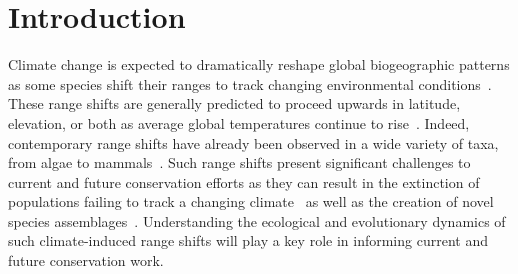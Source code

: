 \documentclass[11pt]{article}
\begin{document}
\newpage{}

\section*{Introduction}
Climate change is expected to dramatically reshape global biogeographic patterns as some species shift their ranges to track changing environmental conditions~\citep{gonzalez2010global}. These range shifts are generally predicted to proceed upwards in latitude, elevation, or both as average global temperatures continue to rise~\citep{loarie2009velocity}. Indeed, contemporary range shifts have already been observed in a wide variety of taxa, from algae to mammals~\citep{chen2011rapid, parmesan2006ecological}. Such range shifts present significant challenges to current and future conservation efforts as they can result in the extinction of populations failing to track a changing climate~\citep{parmesan2006ecological} as well as the creation of novel species assemblages~\citep{hobbs2009novel}. Understanding the ecological and evolutionary dynamics of such climate-induced range shifts will play a key role in informing current and future conservation work.
\end{document}
